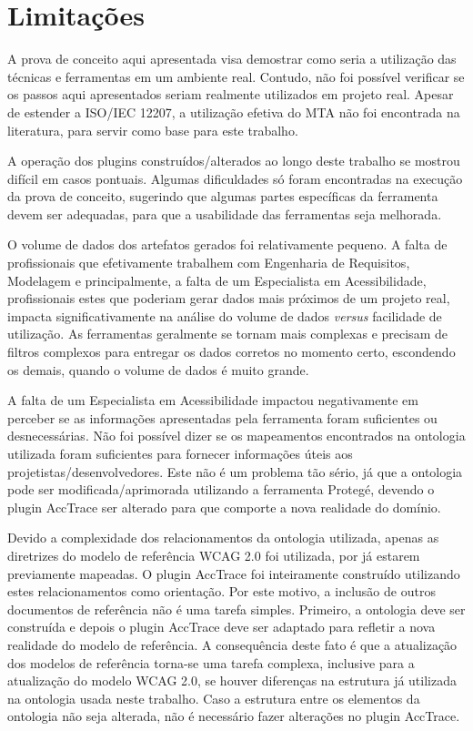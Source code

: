 \documentclass[runningheads,a4paper]{llncs}
\begin{document}
\section{Limitações}

A prova de conceito aqui apresentada visa demostrar como seria a utilização das
técnicas e ferramentas em um ambiente real. Contudo, não foi possível verificar
se os passos aqui apresentados seriam realmente utilizados em projeto real. Apesar de estender a
ISO/IEC 12207, a utilização efetiva do MTA não foi encontrada na
literatura, para servir como base para este trabalho.

A operação dos plugins construídos/alterados ao longo deste trabalho se
mostrou difícil em casos pontuais. Algumas dificuldades só foram
encontradas na execução da prova de conceito, sugerindo que algumas partes
específicas da ferramenta devem ser adequadas, para que a usabilidade das
ferramentas seja melhorada.

O volume de dados dos artefatos gerados foi relativamente pequeno. A falta de
profissionais que efetivamente trabalhem com Engenharia de Requisitos, Modelagem
e principalmente, a falta de um Especialista em Acessibilidade, profissionais
estes que poderiam gerar dados mais próximos de um projeto real, impacta
significativamente na análise do volume de dados \textit{versus} facilidade de
utilização. As ferramentas geralmente se tornam mais complexas e precisam de
filtros complexos para entregar os dados corretos no momento certo, escondendo
os demais, quando o volume de dados é muito grande.

A falta de um Especialista em Acessibilidade impactou negativamente em perceber
se as informações apresentadas pela ferramenta foram suficientes ou
desnecessárias. Não foi possível dizer se os mapeamentos encontrados na
ontologia utilizada foram suficientes para fornecer informações úteis aos
projetistas/desenvolvedores. Este não é um problema tão sério, já que a
ontologia pode ser modificada/aprimorada utilizando a ferramenta
Protegé, devendo o plugin AccTrace ser alterado para que
comporte a nova realidade do domínio.

Devido a complexidade dos relacionamentos da ontologia utilizada, apenas as
diretrizes do modelo de referência WCAG 2.0 foi utilizada, por já estarem
previamente mapeadas. O plugin AccTrace foi inteiramente construído
utilizando estes relacionamentos como orientação. Por este motivo, a inclusão de
outros documentos de referência não é uma tarefa simples. Primeiro,
a ontologia deve ser construída e depois o plugin AccTrace deve ser
adaptado para refletir a nova realidade do modelo de referência. A consequência
deste fato é que a atualização dos modelos de referência torna-se uma tarefa
complexa, inclusive para a atualização do modelo WCAG 2.0, se houver diferenças na estrutura já utilizada na ontologia usada neste trabalho.
Caso a estrutura entre os elementos da ontologia não seja alterada, não é necessário fazer alterações no plugin AccTrace.
\end{document}
